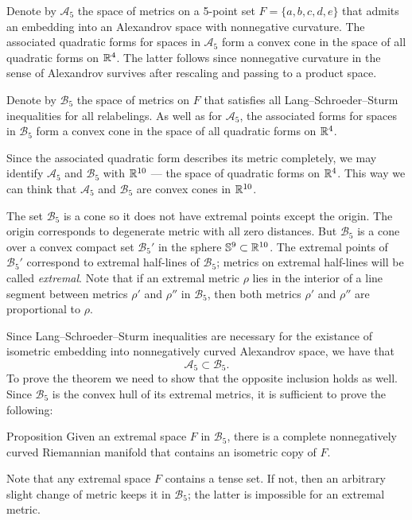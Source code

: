 \documentclass{article}
\begin{document}
Denote by $\mathcal{A}_5$ the space of metrics on a 5-point set $F=\{a,b,c,d,e\}$ that admits an embedding into an Alexandrov space with nonnegative curvature.
The associated quadratic forms for spaces in $\mathcal{A}_5$ form a convex cone in the space of all quadratic forms on $\mathbb{R}^4$.
The latter follows since nonnegative curvature in the sense of Alexandrov survives after rescaling and passing to a product space.

Denote by $\mathcal{B}_5$ the space of metrics on $F$ that satisfies all Lang--Schroeder--Sturm inequalities for all relabelings.
As well as for $\mathcal{A}_5$, the associated forms for spaces in $\mathcal{B}_5$ form a convex cone in the space of all quadratic forms on $\mathbb{R}^4$.

Since the associated quadratic form describes its metric completely, we may identify $\mathcal{A}_5$ and $\mathcal{B}_5$ with $\mathbb{R}^{10}$ --- the space of quadratic forms on $\mathbb{R}^4$.
This way we can think that $\mathcal{A}_5$ and $\mathcal{B}_5$ are convex cones in $\mathbb{R}^{10}$.

The set $\mathcal{B}_5$ is a cone so it does not have extremal points except the origin.
The origin corresponds to degenerate metric with all zero distances.
But $\mathcal{B}_5$ is a cone over a convex compact set $\mathcal{B}_5'$ in the sphere $\mathbb{S}^9\subset \mathbb{R}^{10}$.
The extremal points of $\mathcal{B}_5'$ correspond to extremal half-lines of $\mathcal{B}_5$;
metrics on extremal half-lines will be called \emph{extremal}.
Note that if an extremal metric $\rho$ lies in the interior of a line segment between metrics $\rho'$ and $\rho''$ in $\mathcal{B}_5$, then both metrics $\rho'$ and $\rho''$ are proportional to $\rho$.

Since Lang--Schroeder--Sturm inequalities are necessary for the existance of isometric embedding into nonnegatively curved Alexandrov space,
we have that 
\[\mathcal{A}_5\subset\mathcal{B}_5.\]
To prove the theorem we need to show that the opposite inclusion holds as well.
Since $\mathcal{B}_5$ is the convex hull of its extremal metrics, it is sufficient to prove the following:

\begin{thm}{Proposition}\label{prop:main}
Given an extremal space $F$ in $\mathcal{B}_5$, there is a complete nonnegatively curved Riemannian manifold that contains an isometric copy of $F$.
\end{thm}

Note that any extremal space  $F$ contains a tense set.
If not, then an arbitrary slight change of metric keeps it in $\mathcal{B}_5$;
the latter is impossible for an extremal metric.
\end{document}
